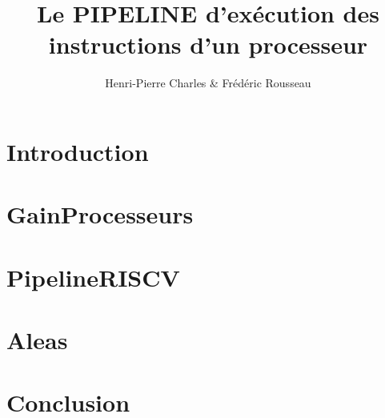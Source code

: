 \documentclass[aspectratio=169]{beamer}
\title{Le PIPELINE d'exécution des instructions d'un processeur}
\author{Henri-Pierre Charles \& Frédéric Rousseau}
\date{}
\newcommand{\Slide}[1]{}
\begin{document}
\begin{frame}
\titlepage
\end{frame}


\begin{frame}
\tableofcontents[
]
\end{frame}


\section{Introduction}
\Slide{Introduction/SlideIntro}
\Slide{Introduction/PrincipeAlgoProcesseur}
\Slide{Introduction/Principe}
\Slide{Introduction/LesTempsModernes}
\Slide{Introduction/AnalogieSansPipeline}
\Slide{Introduction/AnalogieAvecPipeline}
\Slide{Introduction/PerfLaverie}

\section{GainProcesseurs}
\Slide{GainProcesseurs/Interet1}
\Slide{GainProcesseurs/Interet2}
\Slide{GainProcesseurs/Interet3}

\section{PipelineRISCV}
\Slide{PipelineRISCV/ArchiRISCV1}
\Slide{PipelineRISCV/ArchiRISCV2}
\Slide{PipelineRISCV/ArchiRISCV3}
\Slide{PipelineRISCV/ArchiRISCV4}
\Slide{PipelineRISCV/ArchiRISCV5}
\Slide{PipelineRISCV/ArchiRISCV6}
\Slide{PipelineRISCV/ArchiRISCV7}
\Slide{PipelineRISCV/ArchiRISCV8}

\section{Aleas}
\Slide{Aleas/PrincipeAleas}
\Slide{Aleas/ListeAleas}
\Slide{Aleas/AleasDonnees1}
\Slide{Aleas/AleasDonnees2}
\Slide{Aleas/AleasDonnees3}
\Slide{Aleas/AleasDonnees4}
\Slide{Aleas/AleasDonnees5}

\Slide{Aleas/AleasBranch1}
\Slide{Aleas/AleasBranch2}
\Slide{Aleas/AleasBranch3}
\Slide{Aleas/ExempleCodeNop}
\Slide{Aleas/AleasITExc1}
\section{Conclusion}
\Slide{Conclusion/ARM}
\Slide{Conclusion/Conclusion}
\Slide{Conclusion/ExerciceTD}
\end{document}
